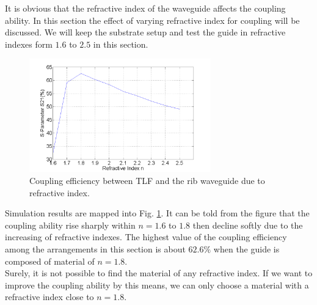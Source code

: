 It is obvious that the refractive index of the waveguide affects the coupling ability. In this section the effect of varying refractive index for coupling will be discussed. 
We will keep the substrate setup and test the guide in refractive indexes form $1.6$ to $2.5$ in this section.\\

\begin{figure}[!ht]
\centering
\includegraphics[width=0.7\textwidth]{bilder/s21_refractive_index}
\caption{Coupling efficiency between TLF and the rib waveguide due to refractive index.}
\label{fig:refractive_index}
\end{figure}
Simulation results are mapped into Fig. \ref{fig:refractive_index}. It can be told from the figure that the coupling ability rise sharply within $n=1.6$ to $1.8$ then decline softly due to the increasing of refractive indexes. The highest value of the coupling efficiency among the arrangements in this section is about $62.6\%$ when the guide is composed of material of $n=1.8$.\\

Surely, it is not possible to find the material of any refractive index. If we want to improve the coupling ability by this means, we can only choose a material with a refractive index close to $n=1.8$.
